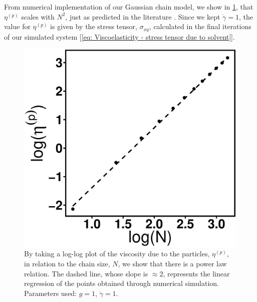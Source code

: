 \documentclass[../../main.tex]{subfiles}
\begin{document}
    From numerical implementation of our Gaussian chain model, we show in \cref{fig: shear - chain size}, that $\eta^{(p)}$ scales with $N^2$, just as predicted in the literature \cite{doiTheoryPolymerDynamics1988}. Since we kept $\Dot{\gamma} = 1$, the value for $\eta^{(p)}$ is given by the stress tensor, $\sigma_{xy}$, calculated in the final iterations of our simulated system [\cref{eq: Viscoelasticity - stress tensor due to solvent}].
        \begin{figure}[h]
            \centering
            \includegraphics[scale=0.4]{Figures/shear_Nchains.eps}
            \caption{By taking a log-log plot of the viscosity due to the particles, $\eta^{(p)}$, in relation to the chain size, $N$, we show that there is a power law relation. The dashed line, whose slope is $\approx2$, represents the linear regression of the points obtained through numerical simulation. Parameters used: $g = 1$, $\Dot{\gamma} = 1$.}
            \label{fig: shear - chain size}
        \end{figure}
       
%
\end{document}
